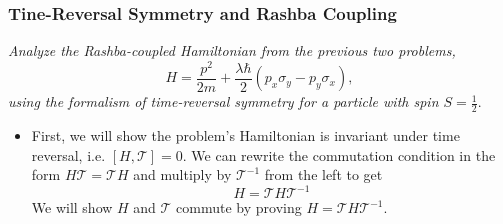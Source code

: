 \documentclass[11pt, a4paper]{article}
\newcommand{\T}{\mathcal{T}}  %
\begin{document}
	
	
	
	
\subsubsection{Tine-Reversal Symmetry and Rashba Coupling}
\textit{Analyze the Rashba-coupled Hamiltonian from the previous two problems,}
\begin{equation*}
	H = \frac{p^{2}}{2m} + \frac{\lambda\hbar}{2} (p_{x}\sigma_{y} - p_{y}\sigma_{x}),
\end{equation*}
\textit{using the formalism of time-reversal symmetry for a particle with spin $ S = \frac{1}{2} $}.

\begin{itemize}	
	\item First, we will show the problem's Hamiltonian is invariant under time reversal, i.e. $ [H, \T] = 0 $. We can rewrite the commutation condition in the form $ H\T = \T H $ and multiply by $ \T^{-1} $ from the left to get
	\begin{equation*}
		H = \T H \T^{-1}
	\end{equation*}
	We will show $ H $ and $ \T $ commute by proving $ H = \T H \T^{-1} $.
	

\end{itemize}
\end{document}
